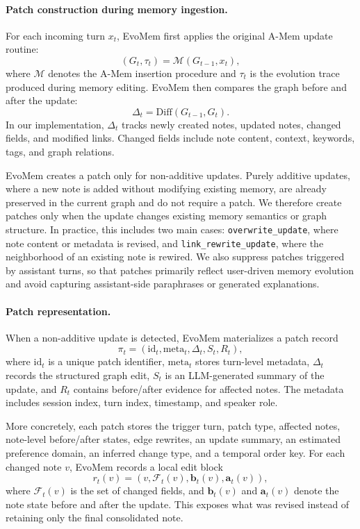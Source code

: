 \documentclass{article}
\begin{document}
\paragraph{Patch construction during memory ingestion.}
For each incoming turn $x_t$, EvoMem first applies the original A-Mem update routine:
\[
(G_t,\tau_t)=\mathcal{M}(G_{t-1},x_t),
\]
where $\mathcal{M}$ denotes the A-Mem insertion procedure and $\tau_t$ is the evolution trace produced during memory editing. EvoMem then compares the graph before and after the update:
\[
\Delta_t=\mathrm{Diff}(G_{t-1},G_t).
\]
In our implementation, $\Delta_t$ tracks newly created notes, updated notes, changed fields, and modified links. Changed fields include note content, context, keywords, tags, and graph relations.

EvoMem creates a patch only for non-additive updates. Purely additive updates, where a new note is added without modifying existing memory, are already preserved in the current graph and do not require a patch. We therefore create patches only when the update changes existing memory semantics or graph structure. In practice, this includes two main cases: \texttt{overwrite\_update}, where note content or metadata is revised, and \texttt{link\_rewrite\_update}, where the neighborhood of an existing note is rewired. We also suppress patches triggered by assistant turns, so that patches primarily reflect user-driven memory evolution and avoid capturing assistant-side paraphrases or generated explanations.

\paragraph{Patch representation.}
When a non-additive update is detected, EvoMem materializes a patch record
\[
\pi_t =
\left(
\mathrm{id}_t,
\mathrm{meta}_t,
\Delta_t,
S_t,
R_t
\right),
\]
where $\mathrm{id}_t$ is a unique patch identifier, $\mathrm{meta}_t$ stores turn-level metadata, $\Delta_t$ records the structured graph edit, $S_t$ is an LLM-generated summary of the update, and $R_t$ contains before/after evidence for affected notes. The metadata includes session index, turn index, timestamp, and speaker role.

More concretely, each patch stores the trigger turn, patch type, affected notes, note-level before/after states, edge rewrites, an update summary, an estimated preference domain, an inferred change type, and a temporal order key. For each changed note $v$, EvoMem records a local edit block
\[
r_t(v)=\left(v,\mathcal{F}_t(v),\mathbf{b}_t(v),\mathbf{a}_t(v)\right),
\]
where $\mathcal{F}_t(v)$ is the set of changed fields, and $\mathbf{b}_t(v)$ and $\mathbf{a}_t(v)$ denote the note state before and after the update. This exposes what was revised instead of retaining only the final consolidated note.
\end{document}
